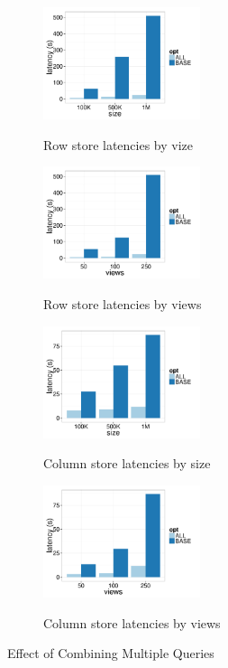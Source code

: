 \begin{figure}[t]
	\centering
	\begin{subfigure}{0.24\linewidth}
		\centering
		{\includegraphics[width=4.6cm] {Images/row_all_none_by_size.pdf}}
		\caption{Row store latencies by vize}
		\label{fig:row_all_none_size}
	\end{subfigure}
	\begin{subfigure}{0.24\linewidth}
		\centering
		{\includegraphics[width=4.6cm] {Images/row_all_none_by_views.pdf}}
		\caption{Row store latencies by views}
		\label{fig:row_all_none_views}
	\end{subfigure}
	\begin{subfigure}{0.24\linewidth}
		\centering
		{\includegraphics[width=4.6cm] {Images/col_all_none_by_size.pdf}}
		\caption{Column store latencies by size}
		\label{fig:col_all_none_size}
	\end{subfigure}
	\begin{subfigure}{0.24\linewidth}
		\centering
		{\includegraphics[width=4.6cm] {Images/col_all_none_by_views.pdf}}
		\caption{Column store latencies by views}
		\label{fig:col_all_none_views}
	\end{subfigure}
	\caption{Effect of Combining Multiple Queries }
	\label{fig:all_opt}
\end{figure}



